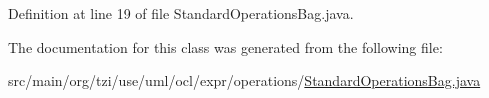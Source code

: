 Definition at line 19 of file Standard\-Operations\-Bag.\-java.



The documentation for this class was generated from the following file\-:\begin{DoxyCompactItemize}
\item 
src/main/org/tzi/use/uml/ocl/expr/operations/\hyperlink{_standard_operations_bag_8java}{Standard\-Operations\-Bag.\-java}\end{DoxyCompactItemize}

